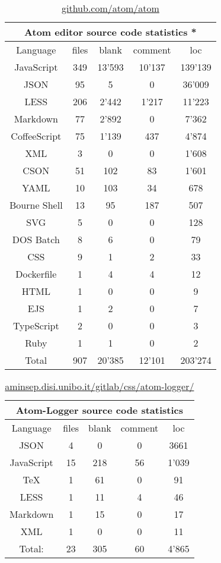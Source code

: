 \documentclass[a4paper,10pt]{report}
\begin{document}
\begin{table} [t]
	\centering
	\begin{tabular}{|c | c | c | c | c |}
 	\hline
	\multicolumn{5}{|c|}{Atom editor source code statistics *}\\
	\hline
	Language & files & blank & comment & loc \\ [0.5ex] 
	\hline\hline
	JavaScript & 349 & 13'593 & 10'137 & 139'139\\ 
	\hline
	JSON & 95 & 5 & 0 & 36'009\\ 
	\hline
	LESS & 206 & 2'442 & 1'217 & 11'223\\
	\hline
	Markdown & 77 & 2'892 & 0 & 7'362\\
	\hline
	CoffeeScript & 75 & 1'139 & 437 & 4'874\\
	\hline
	XML & 3 & 0 & 0 & 1'608\\
	\hline
	CSON & 51 & 102 & 83 & 1'601\\
	\hline
	YAML & 10 & 103 & 34 & 678\\
	\hline
	Bourne Shell & 13 & 95 & 187 & 507\\
	\hline
	SVG & 5 & 0 & 0 & 128\\
	\hline
	DOS Batch & 8 & 6 & 0 & 79\\
	\hline
	CSS & 9 & 1 & 2 & 33\\
	\hline
	Dockerfile & 1 & 4 & 4 & 12\\
	\hline
	HTML & 1 & 0 & 0 & 9\\
	\hline
	EJS & 1 & 2 & 0 & 7\\
	\hline
	TypeScript & 2 & 0 & 0 & 3\\
	\hline
	Ruby & 1 & 1 & 0 & 2\\ 
	\hline
	\hline
	Total & 907 & 20'385 & 12'101 & 203'274\\ [1ex]
	\hline
	\end{tabular}
	\caption{\href{https://github.com/atom/atom}{github.com/atom/atom}}
\end{table}



\begin{table} [t]
	\centering
	\begin{tabular}{|c | c | c | c | c |}
	\hline
	\multicolumn{5}{|c|}{Atom-Logger source code statistics}\\
	\hline
	Language & files & blank & comment & loc \\ [0.5ex] 
	\hline\hline
	JSON & 4 & 0 & 0 & 3661\\
	\hline
	JavaScript & 15 & 218 & 56 & 1'039\\
	\hline
	TeX & 1 & 61 & 0 & 91\\
	\hline
	LESS & 1 & 11 & 4 & 46\\
	\hline
	Markdown & 1 & 15 & 0 & 17\\
	\hline
	XML & 1 & 0 & 0 & 11\\
	\hline
	\hline
	Total: & 23 & 305 & 60 & 4'865\\ [1ex]
	\hline
	\end{tabular}
	\caption{\href{http://aminsep.disi.unibo.it/gitlab/css/atom-logger/}{aminsep.disi.unibo.it/gitlab/css/atom-logger/}}
\end{table}
\clearpage
\end{document}
